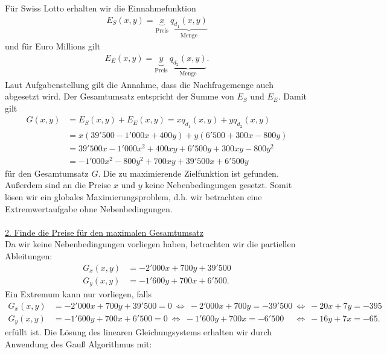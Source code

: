 Für Swiss Lotto erhalten wir die Einnahmefunktion
\begin{align*}
E_S (x,y) = \underbrace{x}_{\textrm{Preis}} \ \underbrace{q_{d_1}(x,y)}_{\textrm{Menge}}
\end{align*}
und für Euro Millions gilt
\begin{align*}
E_E(x,y) = \underbrace{y}_{\textrm{Preis}} \  \underbrace{q_{d_2}(x,y)}_{\textrm{Menge}}.
\end{align*}
Laut Aufgabenstellung gilt die Annahme, dass die Nachfragemenge auch abgesetzt wird.
Der Gesamtumsatz entspricht der Summe von $ E_S $ und $ E_E $.
Damit gilt 
\begin{align*}
G(x,y)
&=
E_S(x,y) + E_E(x,y) 
= 
x q_{d_1}(x,y) + y q_{d_2}(x,y)\\
&=
x(39'500 - 1'000 x + 400y ) + y (6'500 + 300 x - 800 y)\\
&=
39'500x - 1'000 x^2 + 400 xy + 6'500 y + 300 xy - 800 y^2\\
&=
- 1'000 x^2 - 800 y^2 + 700 xy + 39'500x + 6'500 y
\end{align*}
für den Gesamtumsatz $ G $. Die zu maximierende Zielfunktion ist gefunden. Außerdem sind an die Preise $ x $ und $ y $ keine Nebenbedingungen gesetzt.
Somit lösen wir ein globales Maximierungsproblem, d.h. wir betrachten eine Extremwertaufgabe ohne Nebenbedingungen.\\
\\
\underline{2. Finde die Preise für den maximalen Gesamtumsatz}\\
Da wir keine Nebenbedingungen vorliegen haben, betrachten wir die partiellen Ableitungen:
\begin{align*}
G_x(x,y) &= -2'000 x + 700 y + 39'500\\
G_y(x,y) &= -1'600 y + 700 x + 6'500.
\end{align*}
Ein Extremum kann nur vorliegen, falls
\begin{align*}
G_x(x,y) &= -2'000 x + 700 y + 39'500 = 0  \ \Leftrightarrow \ -2'000 x + 700 y  = -39'500 \ \Leftrightarrow \ -20 x + 7 y  = -395\\
G_y(x,y) &= -1'600 y + 700 x + 6'500 = 0  \ \Leftrightarrow \ -1'600 y + 700 x  = - 6'500 \ \quad  \Leftrightarrow \ -16 y + 7 x  = - 65.
\end{align*}
erfüllt ist. Die Lösung des linearen Gleichungsystems erhalten wir durch Anwendung des Gauß Algorithmus mit:
